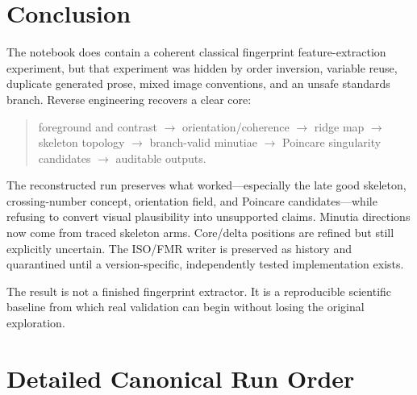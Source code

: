 \documentclass[11pt]{article}
\begin{document}
\section{Conclusion}

The notebook does contain a coherent classical fingerprint feature-extraction experiment, but that experiment was hidden by order inversion, variable reuse, duplicate generated prose, mixed image conventions, and an unsafe standards branch. Reverse engineering recovers a clear core:

\begin{quote}
foreground and contrast $\rightarrow$ orientation/coherence $\rightarrow$ ridge map $\rightarrow$ skeleton topology $\rightarrow$ branch-valid minutiae $\rightarrow$ Poincare singularity candidates $\rightarrow$ auditable outputs.
\end{quote}

The reconstructed run preserves what worked---especially the late good skeleton, crossing-number concept, orientation field, and Poincare candidates---while refusing to convert visual plausibility into unsupported claims. Minutia directions now come from traced skeleton arms. Core/delta positions are refined but still explicitly uncertain. The ISO/FMR writer is preserved as history and quarantined until a version-specific, independently tested implementation exists.

The result is not a finished fingerprint extractor. It is a reproducible scientific baseline from which real validation can begin without losing the original exploration.

\clearpage
\appendix

\section{Detailed Canonical Run Order}
\end{document}
